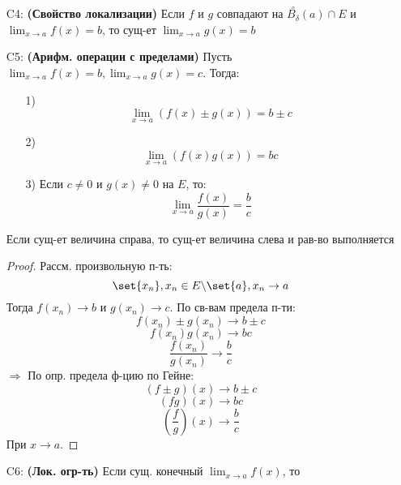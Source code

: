 \begin{itemize}
    \begin{proof}
    Рассм. произв. $\set{x_n}, x_n \in E \backslash \set{a}, x_n \rightarrow a$. Тогда $\exists N, \forall n \geq N (x_n \in \overset{\circ}{B_{\delta}}(a) \cap E)$, а значит:
    \[
    f(x_n) \leq h(x_n) \leq g(x_n), \forall n \geq N
    \]
    По т. о зажатой п-ти: 
    \[
    \begin{cases}
    f(x_n) \rightarrow b \\
    g(x_n) \rightarrow b
    \end{cases} \Rightarrow h(x_n) \rightarrow b
    \]
    По опр-ю Гейне $b = \lim_{x\to a}h(x)$
    \end{proof}
  \item [C4: ] \textbf{(Свойство локализации)} Если $f$ и $g$ совпадают на $\overset{\circ}{B_{\delta}}(a) \cap E$ и $\lim_{x\to a} f(x) = b$, то сущ-ет $\lim_{x \to a}g(x) = b$
  \item [C5: ] \textbf{(Арифм. операции с пределами)} Пусть $\lim_{x\to a} f(x) = b, \lim_{x\to a} g(x) = c$. Тогда:
    \begin{itemize}
      \item [1) ]
    \[
    \lim_{x\to a} (f(x) \pm g(x)) = b \pm c
    \]
      \item [2) ]
    \[
    \lim_{x\to a} (f(x)g(x)) = bc
    \]
  \item [3) ] Если $c \neq 0$ и $g(x) \neq 0$ на $E$, то:
\[
    \lim_{x\to a} \frac{f(x)}{g(x)} = \frac{b}{c}
\]
    \end{itemize}
    \begin{consequence}
    Если сущ-ет величина справа, то сущ-ет величина слева и рав-во выполняется
    \end{consequence}
    \begin{proof}
    Рассм. произвольную п-ть:
    \[
      \set{x_n}, x_n \in E \backslash \set{a}, x_n \rightarrow a
    \]
    Тогда $f(x_n) \rightarrow b$ и $g(x_n) \rightarrow c$. По св-вам предела п-ти:
    \[
      f(x_n) \pm g(x_n) \rightarrow b \pm c
    \]
    \[
      f(x_n)g(x_n) \rightarrow bc
    \]
    \[
      \frac{f(x_n)}{g(x_n)} \rightarrow \frac{b}{c}
    \]
    $\Rightarrow$ По опр. предела ф-цию по Гейне:
    \[
      (f \pm g)(x) \rightarrow b \pm c
    \]
    \[
      (fg)(x) \rightarrow bc
    \]
    \[
      \left(\frac{f}{g}\right)(x) \rightarrow \frac{b}{c}
    \]
    При $x \rightarrow a$.
    \end{proof}
  \item [C6: ] \textbf{(Лок. огр-ть)} Если сущ. конечный $\lim_{x\to a} f(x)$, то

\end{itemize}
